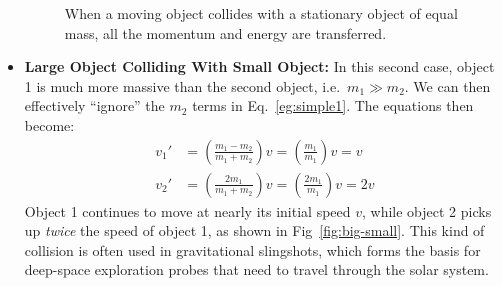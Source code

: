 \begin{itemize}[leftmargin=15pt]
\begin{figure}[ht]
    \caption{When a moving object collides with a stationary object of equal
      mass, all the momentum and energy are transferred.}
    \label{fig:same-mass}
  \end{figure}
\item\textbf{Large Object Colliding With Small Object:} In this second case,
  object 1 is much more massive than the second object, i.e.\ $m_1\gg m_2$. We
  can then effectively ``ignore'' the $m_2$ terms in Eq.~\ref{eg:simple1}. The
  equations then become:
  \begin{align*}
    v_1'&=\left(\frac{m_1-m_2}{m_1+m_2}\right)v=\left(\frac{m_1}{m_1}\right)v
    =v\\
    v_2'&=\left(\frac{2m_1}{m_1+m_2}\right)v=\left(\frac{2m_1}{m_1}\right)v=2v
  \end{align*}
  Object 1 continues to move at nearly its initial speed $v$, while object 2
  picks up \emph{twice} the speed of object 1, as shown in
  Fig~\ref{fig:big-small}. This kind of collision is often used in
  gravitational slingshots, which forms the basis for deep-space exploration
  probes that need to travel through the solar system.
  \begin{figure}[ht]
    \centering
\end{figure}
\end{itemize}
